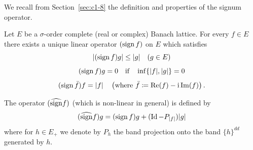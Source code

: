 We recall from Section~\ref{sec:c1-8} the definition and properties of the signum operator.
\begin{proposition}\label{prop:c2-2.1}
%
Let $E$ be a $\sigma$-order complete (real or complex) Banach lattice.
For every $f \in E$ there exists a unique linear operator $(\operatorname{sign} f)$ on $E$ which satisfies
\begin{equation}\label{eq:c2-2.1}
	|(\sign f)g| \leq |g| \quad (g \in E)
\end{equation}
\begin{equation}\label{eq:c2-2.2}
(\operatorname{sign} f)g = 0 \quad \text{if} \quad \inf\{|f|,|g|\} = 0
\end{equation}
\begin{equation}\label{eq:c2-2.3}
(\operatorname{sign} \bar{f})f = |f| \quad \left(\text{where } \bar{f} \coloneq \mathop{}\!\mathrm{Re}(f) - \mathrm{i}\mathop{}\!\mathrm{Im}(f) \right) .
\end{equation}
\end{proposition}
The operator $(\widehat{\operatorname{sign}} f)$ (which is non-linear in general) is defined by
\begin{equation}\label{eq:c2-2.4}
(\widehat{\operatorname{sign}}f)g = (\operatorname{sign} f)g + (\operatorname{Id} - P_{|f|})|g|
\end{equation}
where for $h \in E_{+}$ we denote by $P_h$ the band projection onto the band $\{h\}^{dd}$ generated by $h$.

